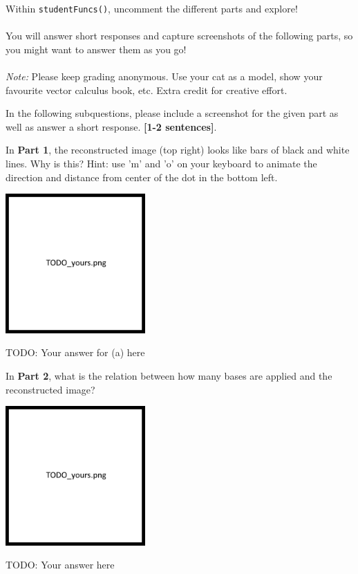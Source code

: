\documentclass{csci1430}
\begin{document}
Within \verb!studentFuncs()!, uncomment the different parts and explore!
\\
\\
You will answer short responses and capture screenshots of the following parts, so you might want to answer them as you go!
\\
\\
\emph{Note:} Please keep grading anonymous. Use your cat as a model, show your favourite vector calculus book, etc. Extra credit for creative effort.

\newpage

In the following subquestions, please include a screenshot for the given part as well as answer a short response. \textbf{[1-2 sentences]}.

\begin{subquestion}[points=2]
In \textbf{Part 1}, the reconstructed image (top right) looks like bars of black and white lines. Why is this? Hint: use 'm' and 'o' on your keyboard to animate the direction and distance from center of the dot in the bottom left.
\end{subquestion}

\begin{answer}[height=15]
\includegraphics[width=0.4\textwidth,keepaspectratio]{images/TODO_yours.png}

TODO: Your answer for (a) here
\end{answer}

\begin{subquestion}[points=2]
In \textbf{Part 2}, what is the relation between how many bases are applied and the reconstructed image?
\end{subquestion}

\begin{answer}[height=15]
\includegraphics[width=0.4\textwidth,keepaspectratio]{images/TODO_yours.png}

TODO: Your answer here
\end{answer}
\end{document}
